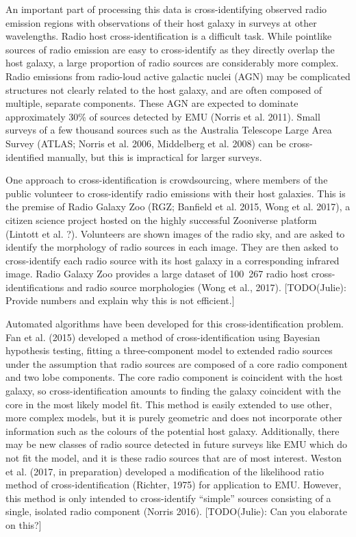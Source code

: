 \documentclass[fleqn,usenatbib,usedcolumn]{mnras}
\begin{document}
  An important part of processing this data is cross-identifying observed
  radio emission regions with observations of their host galaxy in surveys
  at other wavelengths. Radio host cross-identification is a difficult
  task. While pointlike sources of radio emission are easy to
  cross-identify as they directly overlap the host galaxy, a large
  proportion of radio sources are considerably more complex. Radio
  emissions from radio-loud active galactic nuclei (AGN) may be
  complicated structures not clearly related to the host galaxy, and are
  often composed of multiple, separate components. These AGN are expected
  to dominate approximately 30\% of sources detected by EMU (Norris et al.
  2011). Small surveys of a few thousand sources such as the Australia
  Telescope Large Area Survey (ATLAS; Norris et al. 2006, Middelberg et
  al. 2008) can be cross-identified manually, but this is impractical for
  larger surveys.

  One approach to cross-identification is crowdsourcing, where members of
  the public volunteer to cross-identify radio emissions with their host
  galaxies. This is the premise of Radio Galaxy Zoo (RGZ; Banfield et al.
  2015, Wong et al. 2017), a citizen science project hosted on the highly
  successful Zooniverse platform (Lintott et al. ?). Volunteers are shown
  images of the radio sky, and are asked to identify the morphology of
  radio sources in each image. They are then asked to cross-identify each
  radio source with its host galaxy in a corresponding infrared image.
  Radio Galaxy Zoo provides a large dataset of 100~267 radio host
  cross-identifications and radio source morphologies (Wong et al., 2017).
  {[}TODO(Julie): Provide numbers and explain why this is not
  efficient.{]}

  Automated algorithms have been developed for this cross-identification
  problem. Fan et al. (2015) developed a method of cross-identification
  using Bayesian hypothesis testing, fitting a three-component model to
  extended radio sources under the assumption that radio sources are
  composed of a core radio component and two lobe components. The core
  radio component is coincident with the host galaxy, so
  cross-identification amounts to finding the galaxy coincident with the
  core in the most likely model fit. This method is easily extended to use
  other, more complex models, but it is purely geometric and does not
  incorporate other information such as the colours of the potential host
  galaxy. Additionally, there may be new classes of radio source detected
  in future surveys like EMU which do not fit the model, and it is these
  radio sources that are of most interest. Weston et al. (2017, in
  preparation) developed a modification of the likelihood ratio method of
  cross-identification (Richter, 1975) for application to EMU. However,
  this method is only intended to cross-identify ``simple'' sources
  consisting of a single, isolated radio component (Norris 2016).
  {[}TODO(Julie): Can you elaborate on this?{]}
\end{document}
